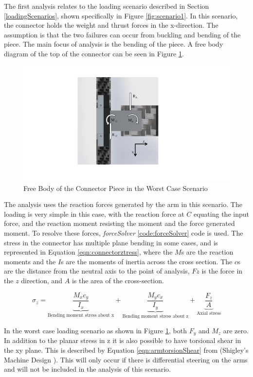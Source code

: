 \documentclass[../main.tex]{subfiles}
\begin{document}
The first analysis relates to the loading scenario described in Section \ref{loadingScenarios}, shown specifically in Figure \ref{fig:scenario1}. In this scenario, the connector holds the weight and thrust forces in the x-direction. The assumption is that the two failures can occur from buckling and bending of the piece. The main focus of analysis is the bending of the piece. A free body diagram of the top of the connector can be seen in Figure \ref{fig:armConnector}. 

\begin{figure}[H]
	\centering
	\includegraphics[page={1}, width=.7\linewidth]{img/analysis/arm/armConnector.pdf}
	\caption{Free Body of the Connector Piece in the Worst Case Scenario}
	\label{fig:armConnector}
\end{figure}


The analysis uses the reaction forces generated by the arm in this scenario. The loading is very simple in this case, with the reaction force at $C$ equating the input force, and the reaction moment resisting the moment and the force generated moment. To resolve these forces, \textit{forceSolver} \ref{code:forceSolver} code is used. The stress in the connector has multiple plane bending in some cases, and is represented in Equation \ref{eqn:connectorztress}, where the $M$s are the reaction moments and the $I$s are the moments of inertia across the cross section. The $c$s are the distance from the neutral axis to the point of analysis, $Fz$ is the force in the $z$ direction, and $A$ is the area of the cross-section.

\begin{equation}
\label{eqn:connectorztress}
\sigma_{z}=  \underbrace{\frac{M_{x}c_y}{I_x}}_\text{Bending moment stress about x} + \underbrace{\frac{M_{y}c_x}{I_y}}_\text{Bending moment stress about z} + \underbrace{\frac{F_z}{A}}_\text{Axial stress} 
\end{equation}

In the worst case loading scenario as shown in Figure \ref{fig:armConnector}, both $F_y$ and $M_z$ are zero. In addition to the planar stress in z it is also possible to have torsional shear in the xy plane. This is described by Equation \ref{eqn:armtorsionShear} from {(Shigley's Machine Design \cite[102]{shigley})}. This will only occur if there is differential steering on the arms and will not be included in the analysis of this scenario.
\end{document}
